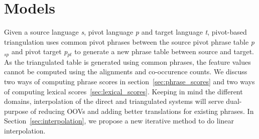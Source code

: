 \documentclass[11pt]{article}
\begin{document}

\section{Models}
\label{sec:models}
	
	
	Given a source language \emph{s}, pivot language \emph{p} and target language \emph{t}, pivot-based triangulation uses common pivot phrases between the source pivot phrase table \emph{p$_{sp}$} and pivot target \emph{p$_{pt}$} to generate a new phrase table between source and target. As the triangulated table is generated using common phrases, the feature values cannot be computed using the alignments and co-occurence counts. We discuss two ways of computing phrase scores in section~\ref{sec:phrase_scores} and two ways of computing lexical scores~\ref{sec:lexical_scores}. Keeping in mind the different domains, interpolation of the direct and triangulated systems will serve dual-purpose of reducing OOVs and adding better translations for existing phrases. In Section~\ref{sec:interpolation}, we propose a new iterative method to do linear interpolation.  
\end{document}
